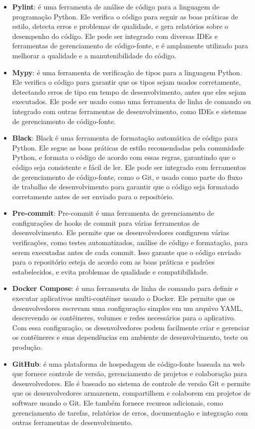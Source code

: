 \begin{itemize}
    \item \textbf{Pylint}: é uma ferramenta de análise de código para a linguagem de programação Python. Ele verifica o código para seguir as boas práticas de estilo, detecta erros e problemas de qualidade, e gera relatórios sobre o desempenho do código. Ele pode ser integrado com diversas IDEs e ferramentas de gerenciamento de código-fonte, e é amplamente utilizado para melhorar a qualidade e a manutenibilidade do código.
    \item \textbf{Mypy}: é uma ferramenta de verificação de tipos para a linguagem Python. Ele verifica o código para garantir que os tipos sejam usados corretamente, detectando erros de tipo em tempo de desenvolvimento, antes que eles sejam executados. Ele pode ser usado como uma ferramenta de linha de comando ou integrado com outras ferramentas de desenvolvimento, como IDEs e sistemas de gerenciamento de código-fonte.
    \item \textbf{Black}: Black é uma ferramenta de formatação automática de código para Python. Ele segue as boas práticas de estilo recomendadas pela comunidade Python, e formata o código de acordo com essas regras, garantindo que o código seja consistente e fácil de ler. Ele pode ser integrado com ferramentas de gerenciamento de código-fonte, como o Git, e usado como parte do fluxo de trabalho de desenvolvimento para garantir que o código seja formatado corretamente antes de ser enviado para o repositório.
    \item \textbf{Pre-commit}: Pre-commit é uma ferramenta de gerenciamento de configurações de hooks de commit para várias ferramentas de desenvolvimento. Ele permite que os desenvolvedores configurem várias verificações, como testes automatizados, análise de código e formatação, para serem executadas antes de cada commit. Isso garante que o código enviado para o repositório esteja de acordo com as boas práticas e padrões estabelecidos, e evita problemas de qualidade e compatibilidade.
    \item \textbf{Docker Compose}: é uma ferramenta de linha de comando para definir e executar aplicativos multi-contêiner usando o Docker. Ele permite que os desenvolvedores escrevam uma configuração simples em um arquivo YAML, descrevendo os contêineres, volumes e redes necessários para o aplicativo. Com essa configuração, os desenvolvedores podem facilmente criar e gerenciar os contêineres e suas dependências em ambiente de desenvolvimento, teste ou produção.
    \item \textbf{GitHub}: é uma plataforma de hospedagem de código-fonte baseada na web que fornece controle de versão, gerenciamento de projetos e colaboração para desenvolvedores. Ele é baseado no sistema de controle de versão Git e permite que os desenvolvedores armazenem, compartilhem e colaborem em projetos de software usando o Git. Ele também fornece recursos adicionais, como gerenciamento de tarefas, relatórios de erros, documentação e integração com outras ferramentas de desenvolvimento.

\end{itemize}
